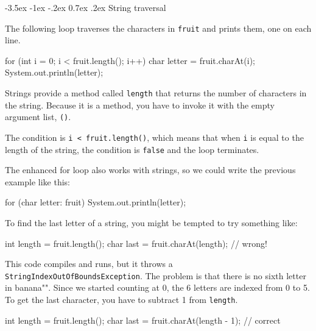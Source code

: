 \documentclass[12pt]{book}
\makeatletter
\theoremstyle{exercise}
\newcommand{\java}[1]{\verb"#1"}
\renewcommand{\section}{\@startsection{section}{1}{\z@}%
    {-3.5ex \@plus -1ex \@minus -.2ex}%
    {0.7ex \@plus.2ex}%
    {\normalfont\Large\bfseries}}
\newcommand{\java}[1]{\lstinline{#1}} %
\makeatother
\begin{document}
\section{String traversal}
\label{stringtraverse}


The following loop traverses the characters in \java{fruit} and prints them, one on each line.

\begin{code}
    for (int i = 0; i < fruit.length(); i++) {
        char letter = fruit.charAt(i);
        System.out.println(letter);
    }
\end{code}

Strings provide a method called \java{length} that returns the number of
characters in the string.
Because it is a method, you have to invoke it with the empty argument list, \java{()}.


The condition is \java{i < fruit.length()}, which means that when \java{i} is equal to the length of the string, the condition is \java{false} and the loop terminates.

The enhanced for loop also works with strings, so we could write the previous example like this:

\begin{code}
    for (char letter: fruit) {
        System.out.println(letter);
    }
\end{code}



To find the last letter of a string, you might be tempted to try something like:

\begin{code}
    int length = fruit.length();
    char last = fruit.charAt(length);      // wrong!
\end{code}

This code compiles and runs, but it throws a \java{StringIndexOutOfBoundsException}.
The problem is that there is no sixth letter in \java{"banana"}.
Since we started counting at 0, the 6 letters are indexed from 0 to 5.
To get the last character, you have to subtract 1 from \java{length}.


\begin{code}
    int length = fruit.length();
    char last = fruit.charAt(length - 1);  // correct
\end{code}
\end{document}
